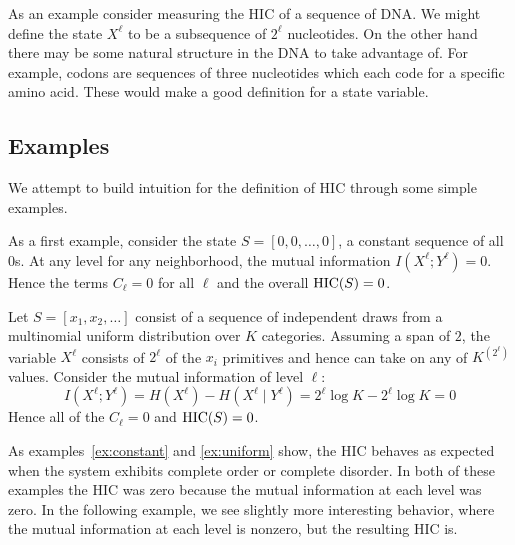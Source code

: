 As an example consider measuring the HIC of a sequence of DNA. We might define
the state $X^\ell$ to be a subsequence of $2^\ell$ nucleotides. On the other
hand there may be some natural structure in the DNA to take advantage of. For
example, codons are sequences of three nucleotides which each code for a
specific amino acid.  These would make a good definition for a state variable.

\subsection{Examples}

We attempt to build intuition for the definition of HIC through some simple
examples.

\begin{example}
  \label{ex:constant}
  As a first example, consider the state $S = [0, 0, \ldots, 0]$,
  a constant sequence of all $0$s. At any level for any neighborhood, the mutual
  information $I(X^\ell; Y^\ell) = 0$. Hence the terms $C_\ell = 0$ for all
  $\ell$ and the overall $\textup{HIC}(S) = 0$.
\end{example}

\begin{example}
  \label{ex:uniform}
  Let $S = [x_1, x_2, \ldots]$ consist of a sequence of independent draws from a
  multinomial uniform distribution over $K$ categories. Assuming a span of $2$,
  the variable $X^\ell$ consists of $2^\ell$ of the $x_i$ primitives and hence
    can take on any of $K^{(2^\ell)}$ values. Consider the mutual information of level
  $\ell$:
  \begin{equation}
    I(X^\ell; Y^\ell) = H(X^\ell) - H(X^\ell \mid Y^{\ell}) = 2^\ell \log K - 2^\ell \log K = 0
  \end{equation}
  Hence all of the $C_\ell = 0$ and $\textup{HIC}(S) = 0$.
\end{example}

As examples~\ref{ex:constant} and \ref{ex:uniform} show, the HIC behaves as
expected when the system exhibits complete order or complete disorder. In both
of these examples the HIC was zero because the mutual information at each level
was zero. In the following example, we see slightly more interesting behavior,
where the mutual information at each level is nonzero, but the resulting HIC
is.

